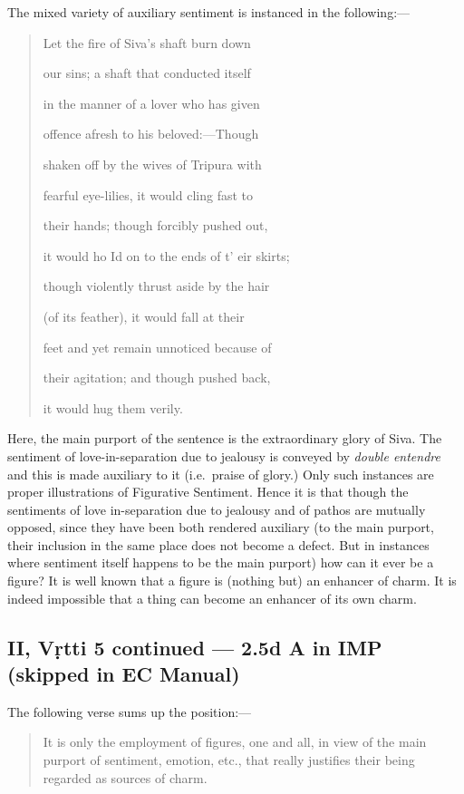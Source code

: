 \documentclass[12pt]{book}
\begin{document}
The mixed variety of auxiliary sentiment is instanced in the
following:---

\begin{quotation}
\begin{em}
Let the fire of Siva's shaft burn down

our sins; a shaft that conducted itself

in the manner of a lover who has given

offence afresh to his beloved:---Though

shaken off by the wives of Tripura with

fearful eye-lilies, it would cling fast to

their hands; though forcibly pushed out,

it would ho Id on to the ends of t' eir skirts;

though violently thrust aside by the hair

(of its feather), it would fall at their

feet and yet remain unnoticed because of

their agitation; and though pushed back,

it would hug them verily.
\end{em}
\end{quotation}


Here, the main purport of the sentence is the extraordinary
glory of Siva. The sentiment of love-in-separation due to jealousy
is conveyed by \textit{double entendre} and this is made auxiliary to it
(i.e.\ praise of glory.) Only such instances are proper illustrations
of Figurative Sentiment. Hence it is that though the sentiments
of love in-separation due to jealousy and of pathos are mutually
opposed, since they have been both rendered auxiliary (to the
main purport, their inclusion in the same place does not become
a defect. But in instances where sentiment itself happens to be the
main purport) how can it ever be a figure? It is well known that a
figure is (nothing but) an enhancer of charm. It is indeed impossible that a thing can become an enhancer of its own charm.


\subsection{II, Vṛtti 5 continued --- 2.5d A in IMP (skipped in EC Manual)}

The following verse sums up the position:---

\begin{quotation}
\begin{em}
It is only the employment of figures, one and all, in
view of the main purport of sentiment, emotion, etc., that
really justifies their being regarded as sources of charm.
\end{em}
\end{quotation}
\end{document}
